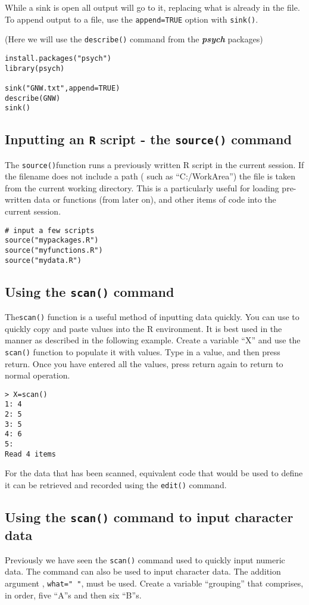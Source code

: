 \documentclass[a4paper,12pt]{article}
\begin{document}
While a sink is open all output will go to it, replacing what is already in the file. To append output
to a file, use the \texttt{append=TRUE} option with \texttt{sink()}. 

(Here we will use the \texttt{describe()} command from the \textbf{\textit{psych}} packages)

\begin{framed}
\begin{verbatim}
install.packages("psych")
library(psych)
 
sink("GNW.txt",append=TRUE)
describe(GNW)
sink()
\end{verbatim}
\end{framed}

\subsection{Inputting an \texttt{R} script - the \texttt{source()} command}
The \texttt{source()}function runs a previously written R script in the current session. If the filename does not include a path ( such as “C:/WorkArea”) the file is taken from the current working directory. This is a particularly useful for loading pre-written data or functions  (from  later on), and other items of code into the current session.

\begin{verbatim}
# input a few scripts
source("mypackages.R")
source("myfunctions.R")
source("mydata.R")
\end{verbatim}

\subsection{ Using the \texttt{scan()} command}
The\texttt{scan()}  function is a useful method of inputting data quickly. You can use to quickly copy and paste values into the R environment.
It is best used in the manner as described in the following example.  Create a variable “X” and use the \texttt{scan()}  function to populate it with values.
Type in a value, and then press return.
Once you have entered all the values, press return again to return to normal operation.
\begin{verbatim}
> X=scan()
1: 4
2: 5
3: 5
4: 6
5: 
Read 4 items
\end{verbatim}
For the data that has been scanned,  equivalent code that would be used to define it can be retrieved and recorded using the \texttt{edit()} command. 
\subsection{Using the \texttt{scan()} command to input character data}
Previously we have seen the \texttt{scan()} command used to quickly input numeric data. The command can also be used to input character data. The addition argument , \texttt{what=" "}, must be used.  
Create a variable “grouping” that comprises, in order,  five “A”s and then six “B”s.
\end{document}
